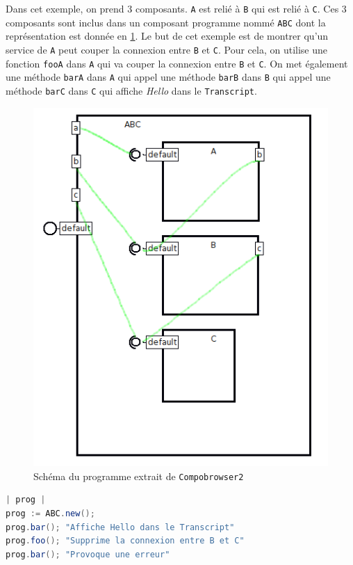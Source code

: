 \documentclass[11pt,a4paper,openany,oneside]{book}
\begin{document}
\begin{appendices}
Dans cet exemple, on prend 3 composants. \texttt{A} est relié à \texttt{B} qui est relié à \texttt{C}. Ces 3 composants sont inclus dans un composant programme nommé \texttt{ABC} dont la représentation est donnée en \ref{abc}. Le but de cet exemple est de montrer qu'un service de \texttt{A} peut couper la connexion entre \texttt{B} et \texttt{C}. Pour cela, on utilise une fonction \texttt{fooA} dans \texttt{A} qui va couper la connexion entre \texttt{B} et \texttt{C}. On met également une méthode \texttt{barA} dans \texttt{A} qui appel une méthode \texttt{barB} dans \texttt{B} qui appel une méthode \texttt{barC} dans \texttt{C} qui affiche \textit{Hello} dans le \texttt{Transcript}.

\begin{figure}[H]
\centering
\includegraphics[scale=0.55, keepaspectratio=true]{abc}
\caption{Schéma du programme extrait de \texttt{Compobrowser2}}
\label{abc}
\end{figure}

\begin{lstlisting}[language=Java, frame=single, caption=Workspace]
| prog |
prog := ABC.new();
prog.bar(); "Affiche Hello dans le Transcript"
prog.foo(); "Supprime la connexion entre B et C"
prog.bar(); "Provoque une erreur" 
\end{lstlisting}


\end{appendices}
\end{document}
